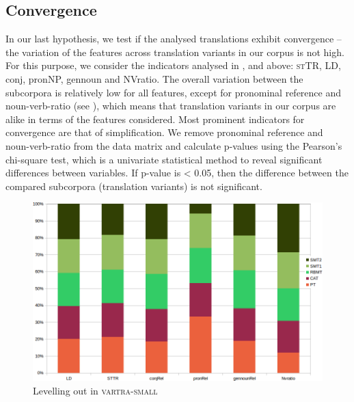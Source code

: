 \documentclass[output=paper]{LSP/langsci}
\begin{document}
\subsection{Convergence}

In our last hypothesis, we test if the analysed translations exhibit convergence – the variation of the features across translation variants in our corpus is not high. For this purpose, we consider the indicators analysed in ,  and  above: \textsc{st}TR, LD, conj, pronNP, gennoun and NVratio. The overall variation between the subcorpora is relatively low for all features, except for pronominal reference and noun-verb-ratio (see ), which means that translation variants in our corpus are alike in terms of the features considered.  Most prominent indicators for convergence are that of simplification.  We remove pronominal reference and noun-verb-ratio from the data matrix and calculate p-values using the Pearson’s chi-square test, which is a univariate statistical method to reveal significant differences between variables. If p-value is < 0.05, then the difference between the compared subcorpora (translation variants) is not significant.

\begin{figure}
\includegraphics[width=1.0\textwidth]{./figures/5-1.png}
\caption{Levelling out in \textsc{vartra}-\textsc{small}} \label{fig:4:1}
\end{figure} 
\end{document}
